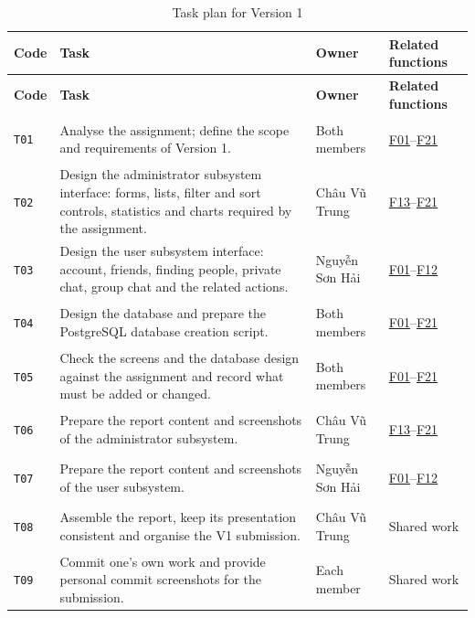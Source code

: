 \begingroup
\small
\setlength{\tabcolsep}{4pt}
\begin{longtable}{|C{1cm}|L{\dimexpr\textwidth-6.6cm-8\arrayrulewidth\relax}|L{3.2cm}|C{2.4cm}|}
  \caption{Task plan for Version 1}
  \label{tab:task-plan}\\
  \hline
  \textbf{Code} & \textbf{Task} & \textbf{Owner} &
  \textbf{Related functions}\\
  \hline
  \endfirsthead
  \hline
  \textbf{Code} & \textbf{Task} & \textbf{Owner} &
  \textbf{Related functions}\\
  \hline
  \endhead
  \hypertarget{T01}{\texttt{T01}} &
    Analyse the assignment; define the scope and requirements of Version 1.
    & Both members & \hyperlink{F01}{F01}--\hyperlink{F21}{F21}\\
  \hline
  \hypertarget{T02}{\texttt{T02}} &
    Design the administrator subsystem interface: forms, lists, filter and
      sort controls, statistics and charts required by the assignment.
    & Châu Vũ Trung & \hyperlink{F13}{F13}--\hyperlink{F21}{F21}\\
  \hline
  \hypertarget{T03}{\texttt{T03}} &
    Design the user subsystem interface: account, friends, finding people,
      private chat, group chat and the related actions.
    & Nguyễn Sơn Hải & \hyperlink{F01}{F01}--\hyperlink{F12}{F12}\\
  \hline
  \hypertarget{T04}{\texttt{T04}} &
    Design the database and prepare the PostgreSQL database creation script.
    & Both members & \hyperlink{F01}{F01}--\hyperlink{F21}{F21}\\
  \hline
  \hypertarget{T05}{\texttt{T05}} &
    Check the screens and the database design against the assignment and
      record what must be added or changed.
    & Both members & \hyperlink{F01}{F01}--\hyperlink{F21}{F21}\\
  \hline
  \hypertarget{T06}{\texttt{T06}} &
    Prepare the report content and screenshots of the administrator subsystem.
    & Châu Vũ Trung & \hyperlink{F13}{F13}--\hyperlink{F21}{F21}\\
  \hline
  \hypertarget{T07}{\texttt{T07}} &
    Prepare the report content and screenshots of the user subsystem.
    & Nguyễn Sơn Hải & \hyperlink{F01}{F01}--\hyperlink{F12}{F12}\\
  \hline
  \hypertarget{T08}{\texttt{T08}} &
    Assemble the report, keep its presentation consistent and organise the V1 submission.
    & Châu Vũ Trung & Shared work\\
  \hline
  \hypertarget{T09}{\texttt{T09}} &
    Commit one's own work and provide personal commit screenshots
      for the submission.
    & Each member & Shared work\\
  \hline
\end{longtable}
\endgroup

